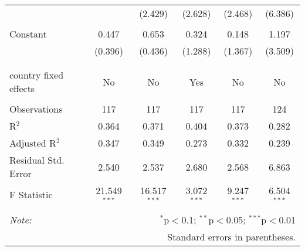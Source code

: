 \begin{tabular}{@{\extracolsep{5pt}}lccccc}
  &  & (2.429) & (2.628) & (2.468) & (6.386) \\ 
  & & & & & \\ 
 Constant & 0.447 & 0.653 & 0.324 & 0.148 & 1.197 \\ 
  & (0.396) & (0.436) & (1.288) & (1.367) & (3.509) \\ 
  & & & & & \\ 
\hline \\[-1.8ex] 
country fixed effects & No & No & Yes & No & No \\ 
\hline \\[-1.8ex] 
Observations & 117 & 117 & 117 & 117 & 124 \\ 
R$^{2}$ & 0.364 & 0.371 & 0.404 & 0.373 & 0.282 \\ 
Adjusted R$^{2}$ & 0.347 & 0.349 & 0.273 & 0.332 & 0.239 \\ 
Residual Std. Error & 2.540 & 2.537 & 2.680 & 2.568 & 6.863 \\ 
F Statistic & 21.549$^{***}$ & 16.517$^{***}$ & 3.072$^{***}$ & 9.247$^{***}$ & 6.504$^{***}$ \\ 
\hline 
\hline \\[-1.8ex] 
\textit{Note:}  & \multicolumn{5}{r}{$^{*}$p$<$0.1; $^{**}$p$<$0.05; $^{***}$p$<$0.01} \\ 
 & \multicolumn{5}{r}{Standard errors in parentheses.} \\ 
\end{tabular} 
\endgroup 
